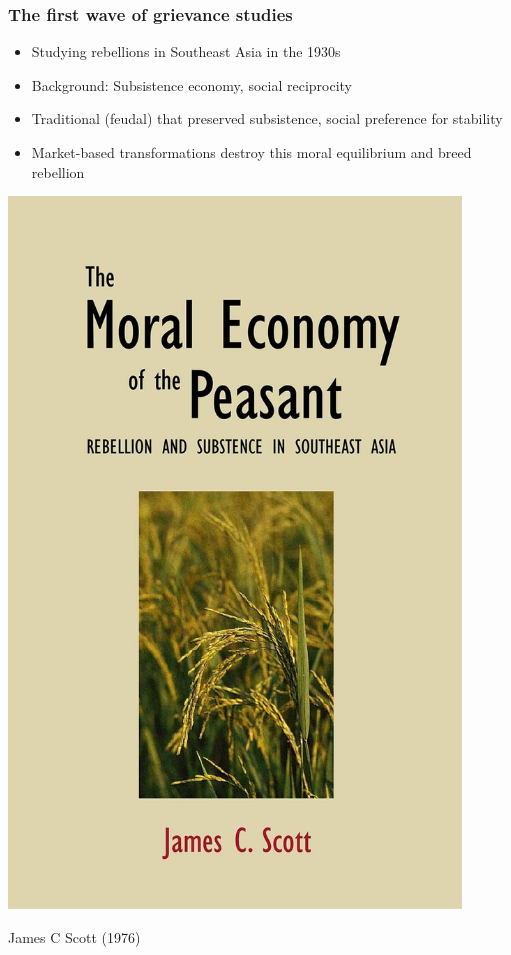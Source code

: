 \documentclass[aspectratio=43]{beamer}
\begin{document}
\begin{frame}
\frametitle{The first wave of grievance studies}
\centering

\begin{minipage}{0.59\textwidth}\centering
\begin{itemize}
  \item Studying rebellions in Southeast Asia in the 1930s
  \item Background: Subsistence economy, social reciprocity
  \item Traditional (feudal)  that preserved subsistence, social preference for stability
  \item<2-> Market-based transformations destroy this moral equilibrium and breed rebellion
\end{itemize}
\end{minipage}\hfill
\begin{minipage}{0.4\textwidth}\centering
\includegraphics[width = 0.9\textwidth]{img/scott_moral}

James C Scott (1976)
\end{minipage}

\end{frame}
\end{document}
